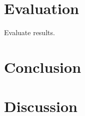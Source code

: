 \documentclass[a4paper, 11pt, table]{article}
\begin{document}
\section{Evaluation}

Evaluate results.

\section{Conclusion}

\section{Discussion}

\printbibliography
\end{document}
